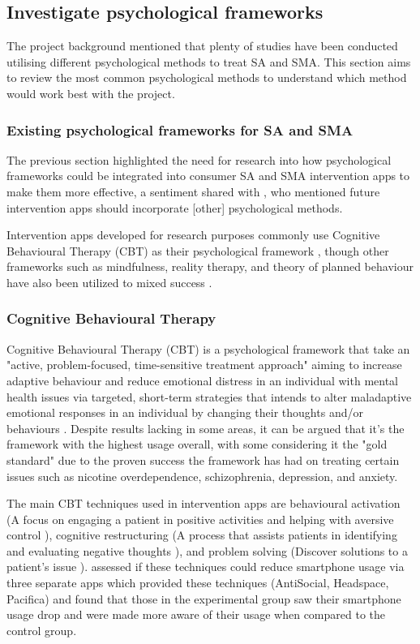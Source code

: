 \documentclass[12pt]{article}
\begin{document}
\subsection{Investigate psychological frameworks}
The project background mentioned that plenty of studies have been conducted utilising different
psychological methods to treat SA and SMA. This section aims to review the most common psychological methods
to understand which method would work best with the project.

\subsubsection{Existing psychological frameworks for SA and SMA}
The previous section highlighted the need for research into how psychological frameworks could be integrated into 
consumer SA and SMA intervention apps to make them more effective, a sentiment shared with 
, who mentioned future intervention apps should 
incorporate [other] psychological methods. \newline

Intervention apps developed for research purposes commonly use Cognitive Behavioural Therapy (CBT) as their 
psychological framework
, though other 
frameworks such as mindfulness, reality therapy, and theory of planned behaviour have also been utilized to 
mixed success 
.

\subsubsection{Cognitive Behavioural Therapy}
Cognitive Behavioural Therapy (CBT) is a psychological framework that take an "active, problem-focused, 
time-sensitive treatment approach" aiming to increase adaptive 
behaviour and reduce emotional distress in an individual with mental health issues via targeted, short-term 
strategies that intends to alter maladaptive emotional responses in an individual by changing their thoughts and/or 
behaviours .
Despite results lacking in some areas, it can be argued that it's the framework with the highest usage 
 overall, with some considering it the "gold 
standard"  due to the proven success the framework has had on 
treating certain issues such as nicotine overdependence, schizophrenia, 
depression, and anxiety. \newline

The main CBT techniques used in intervention apps are behavioural activation (A focus on engaging
a patient in positive activities and helping with aversive control 
), cognitive restructuring (A process that assists patients 
in identifying and evaluating negative thoughts ), and problem solving 
(Discover solutions to a patient's issue ). 
 assessed if these techniques could reduce smartphone 
usage via three separate apps which provided these techniques (AntiSocial, Headspace, Pacifica) and found that 
those in the experimental group saw their smartphone usage drop and were made more aware of their usage when 
compared to the control group.
\end{document}
